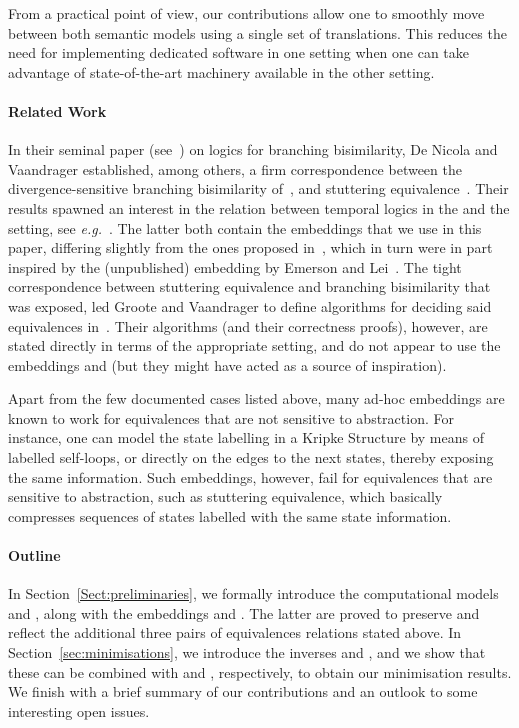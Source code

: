 \documentclass{llncs}
\newcommand{\eg}{\emph{e.g.}}
\begin{document}
From a practical point of view, our contributions allow one to smoothly
move between both semantic models using a single set of translations.
This reduces the need for implementing dedicated software in one setting
when one can take advantage of state-of-the-art machinery available in
the other setting.

\paragraph{Related Work}

In their seminal paper (see~\cite{DBLP:journals/jacm/NicolaV95})
on logics for branching bisimilarity, De Nicola and Vaandrager
established, among others, a firm correspondence between the
divergence-sensitive branching bisimilarity of~\cite{vanGlabbeek96},
and stuttering equivalence~\cite{DBLP:journals/tcs/BrowneCG88}.
Their results spawned an interest in the relation
between temporal logics in the \LTS and the \KS setting, see
\eg~\cite{DBLP:journals/cn/NicolaFGR93,DBLP:conf/litp/NicolaV90}. The
latter both contain the embeddings that we use in this paper, differing
slightly from the ones proposed in~\cite{DBLP:journals/jacm/NicolaV95},
which in turn were in part inspired by the (unpublished) embedding
by Emerson and Lei~\cite{EL:84}.  The tight correspondence between
stuttering equivalence and branching bisimilarity that was exposed,
led Groote and Vaandrager to define algorithms for deciding said
equivalences in~\cite{DBLP:conf/icalp/GrooteV90}. Their algorithms
(and their correctness proofs), however, are stated directly in terms of
the appropriate setting, and do not appear to use the embeddings 
and  (but they might have acted as a source of inspiration).

Apart from the few documented cases listed above, many ad-hoc
embeddings are known to work for equivalences that are not sensitive to
abstraction. For instance, one can model the state labelling in a Kripke
Structure by means of labelled self-loops, or directly on the edges to
the next states, thereby exposing the same information. Such embeddings,
however, fail for equivalences that are sensitive to abstraction, such
as stuttering equivalence, which basically compresses sequences of states
labelled with the same state information.

\paragraph{Outline} In Section~\ref{Sect:preliminaries}, we formally
introduce the computational models \KS and \LTS, along with the
embeddings  and . The latter are proved to preserve and
reflect the additional three pairs of equivalences relations stated
above. In Section~\ref{sec:minimisations}, we introduce the inverses
 and , and we show that these can be combined with
 and , respectively, to obtain our minimisation results.
We finish with a brief summary of our contributions and an outlook to
some interesting open issues.
\end{document}
